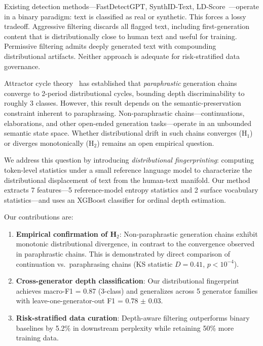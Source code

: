 \documentclass[letterpaper, 10pt]{article}
\begin{document}
Existing detection methods---FastDetectGPT, SynthID-Text, LD-Score~\cite{bao2024fastdetectgpt, dathathri2024synthid, dugan2024ldscore}---operate in a binary paradigm: text is classified as real or synthetic.
This forces a lossy tradeoff.
Aggressive filtering discards all flagged text, including first-generation content that is distributionally close to human text and useful for training.
Permissive filtering admits deeply generated text with compounding distributional artifacts.
Neither approach is adequate for risk-stratified data governance.

Attractor cycle theory~\cite{briesch2025attractor} has established that \emph{paraphrastic} generation chains converge to 2-period distributional cycles, bounding depth discriminability to roughly 3 classes.
However, this result depends on the semantic-preservation constraint inherent to paraphrasing.
Non-paraphrastic chains---continuations, elaborations, and other open-ended generation tasks---operate in an unbounded semantic state space.
Whether distributional drift in such chains converges (H$_1$) or diverges monotonically (H$_2$) remains an open empirical question.

We address this question by introducing \emph{distributional fingerprinting}: computing token-level statistics under a small reference language model to characterize the distributional displacement of text from the human-text manifold.
Our method extracts 7 features---5 reference-model entropy statistics and 2 surface vocabulary statistics---and uses an XGBoost classifier for ordinal depth estimation.

Our contributions are:
\begin{enumerate}
    \item \textbf{Empirical confirmation of H$_2$}: Non-paraphrastic generation chains exhibit monotonic distributional divergence, in contrast to the convergence observed in paraphrastic chains. This is demonstrated by direct comparison of continuation vs.\ paraphrasing chains (KS statistic $D = 0.41$, $p < 10^{-4}$).
    \item \textbf{Cross-generator depth classification}: Our distributional fingerprint achieves macro-F1 = 0.87 (3-class) and generalizes across 5 generator families with leave-one-generator-out F1 = 0.78 $\pm$ 0.03.
    \item \textbf{Risk-stratified data curation}: Depth-aware filtering outperforms binary baselines by 5.2\% in downstream perplexity while retaining 50\% more training data.
\end{enumerate}
\end{document}
